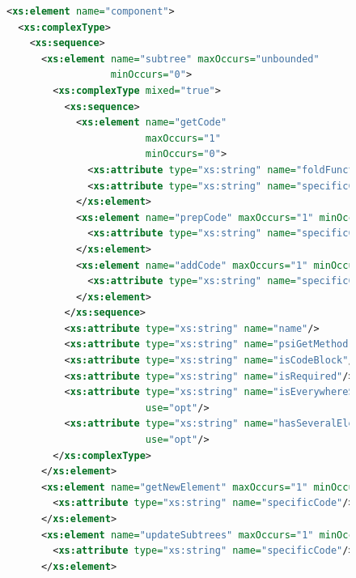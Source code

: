\begin{figure}
\begin{lstlisting}[language=xml]
<xs:element name="component">
  <xs:complexType>
    <xs:sequence>
      <xs:element name="subtree" maxOccurs="unbounded" 
                  minOccurs="0">
        <xs:complexType mixed="true">
          <xs:sequence>
            <xs:element name="getCode" 
                        maxOccurs="1" 
                        minOccurs="0">
              <xs:attribute type="xs:string" name="foldFunction"/>
              <xs:attribute type="xs:string" name="specificCode"/>
            </xs:element>
            <xs:element name="prepCode" maxOccurs="1" minOccurs="0">
              <xs:attribute type="xs:string" name="specificCode"/>
            </xs:element>
            <xs:element name="addCode" maxOccurs="1" minOccurs="0">
              <xs:attribute type="xs:string" name="specificCode"/>
            </xs:element>
          </xs:sequence>
          <xs:attribute type="xs:string" name="name"/>
          <xs:attribute type="xs:string" name="psiGetMethod"/>
          <xs:attribute type="xs:string" name="isCodeBlock"/>
          <xs:attribute type="xs:string" name="isRequired"/>
          <xs:attribute type="xs:string" name="isEverywhereSuit" 
                        use="opt"/>
          <xs:attribute type="xs:string" name="hasSeveralElements" 
                        use="opt"/>
        </xs:complexType>
      </xs:element>    
      <xs:element name="getNewElement" maxOccurs="1" minOccurs="0">
        <xs:attribute type="xs:string" name="specificCode"/>
      </xs:element>
      <xs:element name="updateSubtrees" maxOccurs="1" minOccurs="0">
        <xs:attribute type="xs:string" name="specificCode"/>
      </xs:element>
    \end{lstlisting}
\end{figure}
